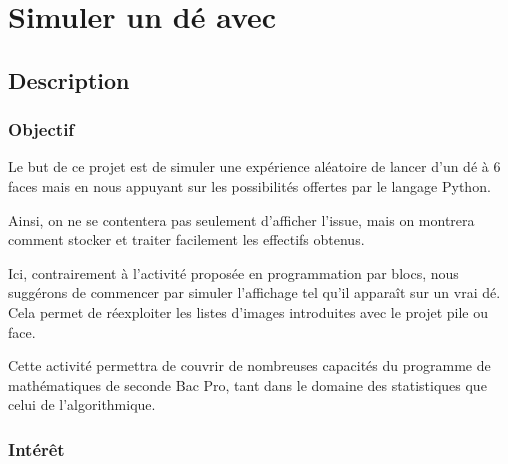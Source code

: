 \section{Simuler un dé avec \mbpy}

%
\subsection{Description}

\subsubsection{Objectif}


\begin{formule}
Le but de ce projet est de simuler une expérience aléatoire de lancer d’un dé à 6 faces mais en nous appuyant sur les possibilités offertes par le langage Python.

Ainsi, on ne se contentera pas seulement d'afficher l'issue, mais on montrera comment stocker et traiter facilement les effectifs obtenus. 

Ici, contrairement à l'activité proposée en programmation par blocs, nous suggérons de commencer par simuler l’affichage tel qu’il apparaît sur un vrai dé. Cela permet de réexploiter les listes d’images introduites avec le projet pile ou face.

Cette activité permettra de couvrir de nombreuses capacités du programme de mathématiques de seconde Bac Pro, tant dans le domaine des statistiques que celui de l'algorithmique.

\end{formule}


\subsubsection{Intérêt}


